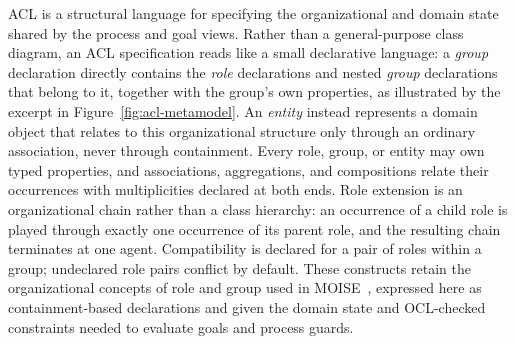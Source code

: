 \documentclass[a4paper, conference]{IEEEtran}
\begin{document}
ACL is a structural language for specifying the organizational and domain state shared by the process and goal views. Rather than a general-purpose class diagram, an ACL specification reads like a small declarative language: a \emph{group} declaration directly contains the \emph{role} declarations and nested \emph{group} declarations that belong to it, together with the group's own properties, as illustrated by the excerpt in Figure~\ref{fig:acl-metamodel}. An \emph{entity} instead represents a domain object that relates to this organizational structure only through an ordinary association, never through containment. Every role, group, or entity may own typed properties, and associations, aggregations, and compositions relate their occurrences with multiplicities declared at both ends. Role extension is an organizational chain rather than a class hierarchy: an occurrence of a child role is played through exactly one occurrence of its parent role, and the resulting chain terminates at one agent. Compatibility is declared for a pair of roles within a group; undeclared role pairs conflict by default. These constructs retain the organizational concepts of role and group used in MOISE~\cite{hubner2002moise}, expressed here as containment-based declarations and given the domain state and OCL-checked constraints needed to evaluate goals and process guards.
\end{document}
